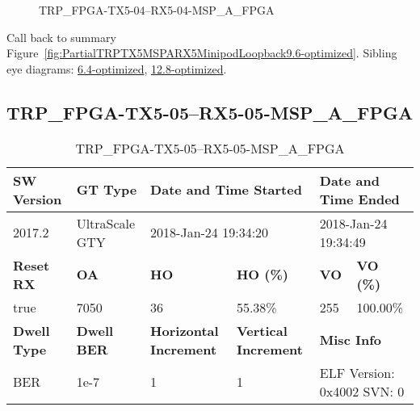 \begin{figure}[h]
\caption{TRP\_FPGA-TX5-04--RX5-04-MSP\_A\_FPGA} \label{fig:TRPFPGATX504RX504MSPAFPGA9.6-optimized}
\end{figure}

Call back to summary Figure~\ref{fig:PartialTRPTX5MSPARX5MinipodLoopback9.6-optimized}.
Sibling eye diagrams: \hyperref[sec:TRPFPGATX504RX504MSPAFPGA6.4-optimized]{6.4-optimized}, \hyperref[sec:TRPFPGATX504RX504MSPAFPGA12.8-optimized]{12.8-optimized}.

\clearpage
\newpage


\subsection{TRP\_FPGA-TX5-05--RX5-05-MSP\_A\_FPGA}\label{sec:TRPFPGATX505RX505MSPAFPGA9.6-optimized}

\begin{table}[h]
\centering
\caption{TRP\_FPGA-TX5-05--RX5-05-MSP\_A\_FPGA}
\label{tab:TRPFPGATX505RX505MSPAFPGA9.6-optimized}
\begin{tabular}{@{}|l|l|l|l|l|l|@{}}
\toprule
\textbf{SW Version}                & \textbf{GT Type}   & \multicolumn{2}{l|}{\textbf{Date and Time Started}}            & \multicolumn{2}{l|}{\textbf{Date and Time Ended}}        \\ \midrule
2017.2                       & UltraScale GTY          & \multicolumn{2}{l|}{2018-Jan-24 19:34:20}                   & \multicolumn{2}{l|}{2018-Jan-24 19:34:49}               \\ \midrule
\textbf{Reset RX}                  & \textbf{OA} & \textbf{HO}   & \textbf{HO (\%)} & \textbf{VO} & \textbf{VO (\%)} \\ \midrule
true & 7050        & 36          & 55.38\%        & 255        & 100.00\%       \\ \midrule
\textbf{Dwell Type}                & \textbf{Dwell BER} & \textbf{Horizontal Increment} & \textbf{Vertical Increment}    & \multicolumn{2}{l|}{\textbf{Misc Info}}                  \\ \midrule
BER                            & 1e-7        & 1        & 1           & \multicolumn{2}{l|}{ELF Version: 0x4002 SVN: 0}                         \\ \bottomrule
\end{tabular}
\end{table}

